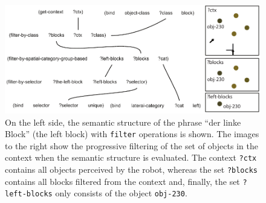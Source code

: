 \begin{figure}
\begin{center}
\includegraphics[width=1.0\columnwidth]{figs/semantic-structure-filtering-der-linke-block}
\end{center}
\caption[Category membership semantics]{On the left side, the semantic structure of the phrase 
``der linke Block'' (the left block) with {\footnotesize\tt filter} operations is shown. The images to 
the right show the progressive filtering of the set of objects in the context when the 
semantic structure is evaluated. The context {\footnotesize\tt ?ctx} contains all objects
perceived by the robot, whereas the set {\footnotesize\tt ?blocks} contains all blocks
filtered from the context and, finally, the set {\footnotesize\tt ?left-blocks} 
only consists of the object {\footnotesize\tt obj-230}.}
\label{f:filtering-operations}
\end{figure}

